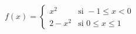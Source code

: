 \item $f(x) = \begin{cases} x^2 & \text{si } -1 \le x < 0 \\ 2 - x^2 & \text{si } 0 \le x \le 1 \end{cases}$
